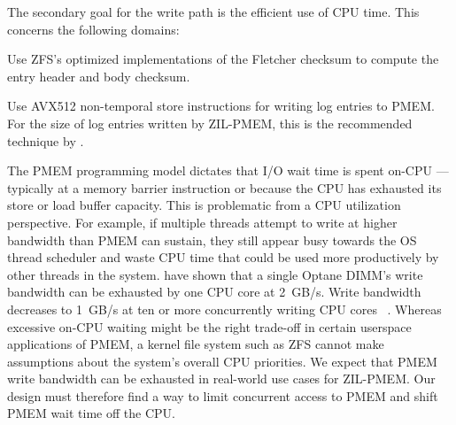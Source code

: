 \documentclass[12pt,a4paper,twoside]{book}
\begin{document}
The secondary goal for the write path is the efficient use of CPU time. This concerns the following domains:
\begin{description}[noitemsep]
    \item[Checksumming] Use ZFS's optimized implementations of the Fletcher checksum to compute the entry header and body checksum.
    \item[Writing Entries] Use AVX512 non-temporal store instructions for writing log entries to PMEM.
        For the size of log entries written by ZIL-PMEM, this is the recommended technique by \citeauthor{yangEmpiricalGuideBehavior2020} \cite{yangEmpiricalGuideBehavior2020}.
    \item[PMEM Bandwidth Limits \& Multicore Scalability] The PMEM programming model dictates that I/O wait time is spent on-CPU --- typically at a memory barrier instruction or because the CPU has exhausted its store or load buffer capacity.
        This is problematic from a CPU utilization perspective.
        For example, if multiple threads attempt to write at higher bandwidth than PMEM can sustain, they still appear busy towards the OS thread scheduler and waste CPU time that could be used more productively by other threads in the system.
        \citeauthor{yangEmpiricalGuideBehavior2020} have shown that a single Optane DIMM's write bandwidth can be exhausted by one CPU core at \SI{2}{GB/s}.
        Write bandwidth decreases to \SI{1}{GB/s} at ten or more concurrently writing CPU cores ~\cite{yangEmpiricalGuideBehavior2020}.
        Whereas excessive on-CPU waiting might be the right trade-off in certain userspace applications of PMEM, a kernel file system such as ZFS cannot make assumptions about the system's overall CPU priorities.
        We expect that PMEM write bandwidth can be exhausted in real-world use cases for ZIL-PMEM.
        Our design must therefore find a way to limit concurrent access to PMEM and shift PMEM wait time off the CPU.
\end{description}
\end{document}
